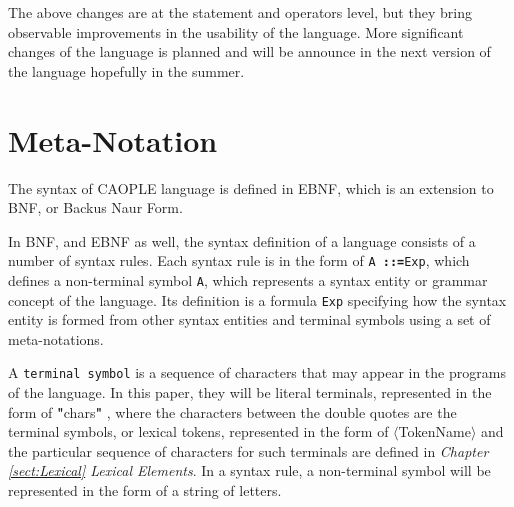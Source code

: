 \documentclass[english]{report}
\newcommand{\defs}{\color{red}\textbf{::=}\color{black}}
\newcommand{\tml}[1]{\color{blue}$\langle$#1$\rangle$\color{black}}
\newcommand{\lit}[1]{\color{red} \textbf{"}\color{blue}#1\color{red}\textbf{"} \color{black}}
\begin{document}
The above changes are at the statement and operators level, but they bring observable improvements in the 
usability of the language. More significant changes of the language is planned and will be announce in the 
next version of the language hopefully in the summer. 

\vspace{+10mm}


\chapter{Meta-Notation} \label{sect: Ch2}

\setcounter{page}{1}

The syntax of CAOPLE language is defined in EBNF, which is an extension to BNF, or Backus Naur Form. 

In BNF, and EBNF as well, the syntax definition of a language consists of a number of syntax rules. 
Each syntax rule is in the form of \texttt{A \defs  Exp}, which defines a non-terminal symbol \texttt{A}, which represents a syntax entity or grammar concept of the language. Its definition is a formula \texttt{Exp} specifying how the syntax entity is formed from other syntax entities 
and terminal symbols using a set of meta-notations. 

A \texttt{terminal symbol} is a sequence of characters that may appear in the programs of the language. In this paper, they will be literal terminals, represented in the form of \lit{chars}, where the characters between the double quotes are the terminal symbols, or lexical tokens, represented in the form of \tml{TokenName} and the particular sequence of characters for such terminals are defined in \emph{Chapter \ref{sect:Lexical} Lexical Elements}. In a syntax rule, a non-terminal symbol will be represented in the form of a string of letters. 
\end{document}
